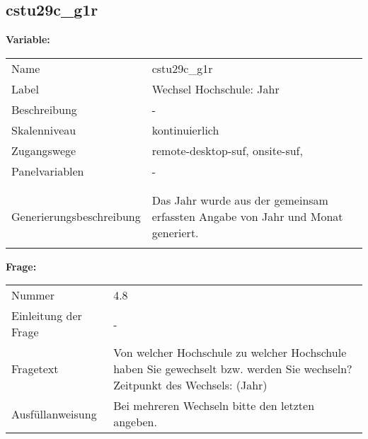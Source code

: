 	
	
	\subsection{cstu29c\_g1r}
	\label{subSection:cstu29c_g1r}

	\noindent\textbf{Variable:}\\
		\begin{tabular}{lL{11.3cm}}
			\label{tableVariable:cstu29c_g1r}
			Name & cstu29c\_g1r \\
			Label & Wechsel Hochschule: Jahr \\
			Beschreibung & - \\
			Skalenniveau & kontinuierlich \\
			Zugangswege &
				remote-desktop-suf,
				onsite-suf,
 \\
			Panelvariablen & -
			 \\
			 \\
 \\
					Generierungsbeschreibung & Das Jahr wurde aus der gemeinsam erfassten Angabe von Jahr und Monat generiert. 
				 \\	
			 \\
		\end{tabular}

		\vspace*{1 cm}
		\noindent\textbf{Frage:}\\
		\begin{tabular}{lL{11.3cm}}
			\label{tableQuestion:cstu29c_g1r}
			Nummer & 4.8 \\
			Einleitung der Frage & - \\
			Fragetext & Von welcher Hochschule zu welcher Hochschule haben Sie gewechselt bzw. werden Sie wechseln?
Zeitpunkt des Wechsels:
(Jahr) \\
			Ausfüllanweisung & Bei mehreren Wechseln bitte den letzten angeben. \\
		\end{tabular}




